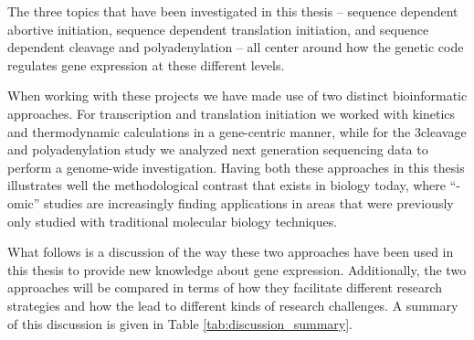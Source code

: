 %
The three topics that have been investigated in this thesis -- sequence
dependent abortive initiation, sequence dependent translation initiation, and
sequence dependent cleavage and polyadenylation -- all center around how the
genetic code regulates gene expression at these different levels.

When working with these projects we have made use of two distinct
bioinformatic approaches. For transcription and translation initiation we
worked with kinetics and thermodynamic calculations in a gene-centric manner,
while for the 3\ppp cleavage and polyadenylation study we analyzed next
generation sequencing data to perform a genome-wide investigation. Having both
these approaches in this thesis illustrates well the methodological contrast
that exists in biology today, where ``-omic'' studies are increasingly finding
applications in areas that were previously only studied with traditional
molecular biology techniques.

What follows is a discussion of the way these two approaches have been used in
this thesis to provide new knowledge about gene expression. Additionally, the
two approaches will be compared in terms of how they facilitate different
research strategies and how the lead to different kinds of research challenges.
A summary of this discussion is given in Table \ref{tab:discussion_summary}.

\begin{table}[hb]
	\begin{center}
	\end{center}
	\caption{A summary of the discussion. The left column holds different
	characteristics that differ between the genome-wide and gene-centric
	studies.}
	\label{tab:discussion_summary}
\end{table}

